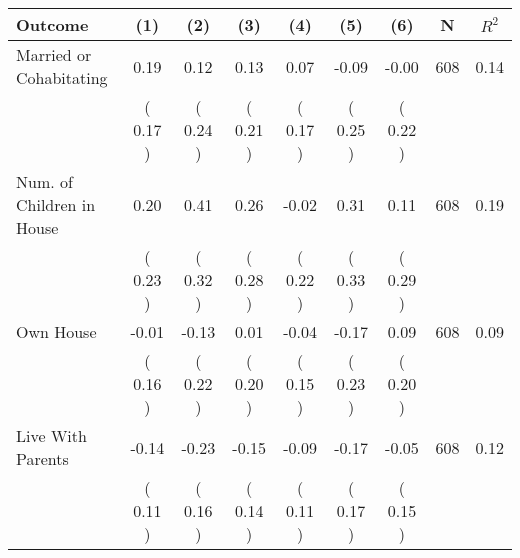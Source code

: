 \begin{tabular}{lcccccccc}
\toprule
 \textbf{Outcome} & \textbf{(1)} & \textbf{(2)} & \textbf{(3)} & \textbf{(4)} & \textbf{(5)} & \textbf{(6)} & \textbf{N} & \textbf{$ R^2$} \\
\midrule
Married or Cohabitating &      0.19 &      0.12 &      0.13 &      0.07 &     -0.09 &     -0.00 & 608 &       0.14 \\ 
 & (     0.17 ) & (     0.24 ) & (     0.21 ) & (     0.17 ) & (     0.25 ) & (     0.22 ) & \\
Num. of Children in House &      0.20 &      0.41 &      0.26 &     -0.02 &      0.31 &      0.11 & 608 &       0.19 \\ 
 & (     0.23 ) & (     0.32 ) & (     0.28 ) & (     0.22 ) & (     0.33 ) & (     0.29 ) & \\
Own House &     -0.01 &     -0.13 &      0.01 &     -0.04 &     -0.17 &      0.09 & 608 &       0.09 \\ 
 & (     0.16 ) & (     0.22 ) & (     0.20 ) & (     0.15 ) & (     0.23 ) & (     0.20 ) & \\
Live With Parents &     -0.14 &     -0.23 &     -0.15 &     -0.09 &     -0.17 &     -0.05 & 608 &       0.12 \\ 
 & (     0.11 ) & (     0.16 ) & (     0.14 ) & (     0.11 ) & (     0.17 ) & (     0.15 ) & \\
\bottomrule
\end{tabular}
